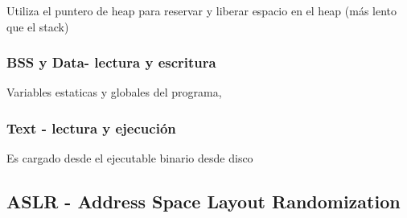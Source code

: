Utiliza el puntero de heap para reservar y liberar espacio en el heap (más lento que el stack)

\subsubsection{BSS y Data- lectura y escritura}

Variables estaticas y globales del programa,

\subsubsection{Text - lectura y ejecución}

Es cargado desde el ejecutable binario desde disco

\subsection{ASLR - Address Space Layout Randomization}








